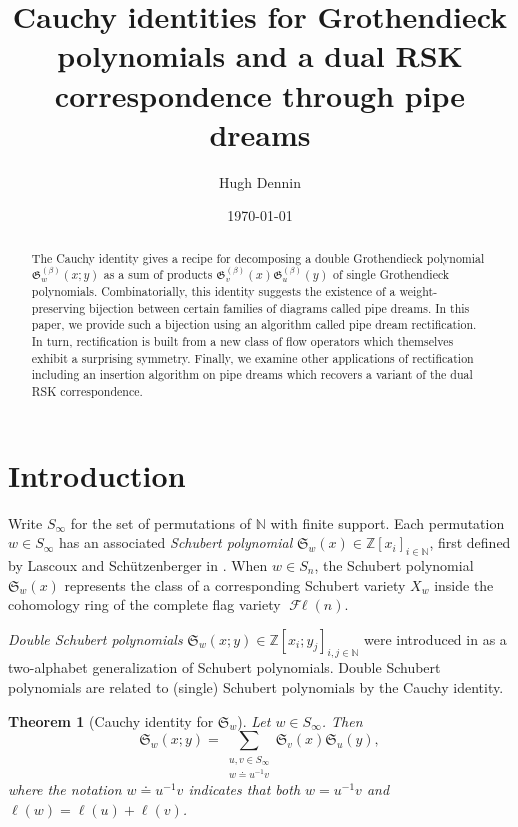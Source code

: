 \documentclass[11pt,reqno]{amsart} %
\title{Cauchy identities for Grothendieck polynomials and a dual RSK correspondence through pipe dreams}
\author{Hugh Dennin}
\date{\today}
\newcommand{\bbN}{\mathbb{N}}
\newcommand{\bbZ}{\mathbb{Z}}
\newcommand{\frakS}{\mathfrak{S}}
\newcommand{\frakG}{\mathfrak{G}}
\DeclareMathOperator{\Fl}{\mathcal{F}\ell}
\newtheorem{theorem}{Theorem}[section]
\theoremstyle{definition}
\begin{document}
\begin{abstract}
    The Cauchy identity gives a recipe for decomposing a double Grothendieck polynomial $\frakG^{(\beta)}_w(x;y)$ as a sum of products $\frakG^{(\beta)}_v(x)\frakG^{(\beta)}_u(y)$ of single Grothendieck polynomials.
    Combinatorially, this identity suggests the existence of a weight-preserving bijection between certain families of diagrams called pipe dreams.
    In this paper, we provide such a bijection using an algorithm called pipe dream rectification.
    In turn, rectification is built from a new class of flow operators which themselves exhibit a surprising symmetry.
    Finally, we examine other applications of rectification including an insertion algorithm on pipe dreams which recovers a variant of the dual RSK correspondence.
\end{abstract}

\maketitle

\setcounter{tocdepth}{1} %
\tableofcontents


\section{Introduction}
\label{sect:intro}

Write $S_\infty$ for the set of permutations of $\bbN$ with finite support.
Each permutation $w\in S_\infty$ has an associated \textit{Schubert polynomial} $\frakS_w(x)\in \bbZ[x_i]_{i\in\bbN}$, first defined by Lascoux and Sch\"utzenberger in \cite{LascouxSchutzenberger82a}.
When $w\in S_n$, the Schubert polynomial $\frakS_w(x)$ represents the class of a corresponding Schubert variety $X_w$ inside the cohomology ring of the complete flag variety $\Fl(n)$.

\emph{Double Schubert polynomials} $\frakS_w(x;y) \in \bbZ[x_i;y_j]_{i,j\in\bbN}$ were introduced in \cite{Lascoux82} as a two-alphabet generalization of Schubert polynomials.
Double Schubert polynomials are related to (single) Schubert polynomials by the Cauchy identity.

\begin{theorem}[Cauchy identity for $\frakS_w$]
\label{thm:cauchy identity}
Let $w\in S_\infty$.
Then \[
    \frakS_w(x;y) =
    \sum_{\substack{u,v\in S_\infty \\ w \doteq u^{-1}v}}
    \frakS_v(x)\frakS_u(y),
\]
where the notation $w \doteq u^{-1}v$ indicates that both $w = u^{-1}v$ and $\ell(w) = \ell(u) + \ell(v)$.
\end{theorem}
\end{document}
